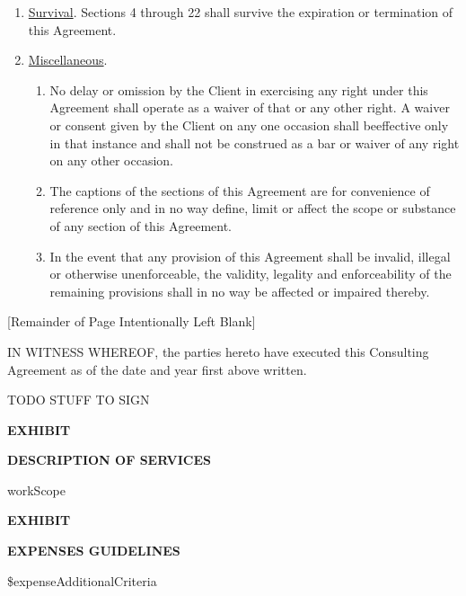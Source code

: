 \documentclass[12pt]{article}
\begin{document}
\begin{enumerate}
    \item \underline{Survival}. Sections 4 through 22 shall survive the expiration or termination of this Agreement.
    \item \underline{Miscellaneous}.
    \begin{enumerate}
        \item No delay or omission by the Client in exercising any right under this Agreement shall operate as a waiver of that or any other right.  A waiver or consent given by the Client on any one occasion shall beeffective only in that instance and shall not be construed as a bar or waiver of any right on any other occasion.
        \item The captions of the sections of this Agreement are for convenience of reference only and in no way define, limit or affect the scope or substance of any section of this Agreement.
        \item In the event that any provision of this Agreement shall be invalid, illegal or otherwise unenforceable, the validity, legality and enforceability of the remaining provisions shall in no way be affected or impaired thereby.
    \end{enumerate}
\end{enumerate}
\begin{center}
[Remainder of Page Intentionally Left Blank]
\end{center}
\newpage

IN WITNESS WHEREOF, the parties hereto have executed this Consulting Agreement as of the date and year first above written.

TODO STUFF TO SIGN
\newpage
\renewcommand{\theexhibit}{\Alph{exhibit}}
\setcounter{exhibit}{0}

\begin{center}
\label{exhibitA}
\vspace{1.5cm}
{\huge\bfseries EXHIBIT  \par}
\vspace{1cm}
{\huge\bfseries \uppercase{Description of Services} \par}
\end{center}
    workScope
\newpage

\begin{center}
\label{exhibitB}
\vspace{1.5cm}
{\huge\bfseries EXHIBIT  \par}
\vspace{1cm}
{\huge\bfseries \uppercase{Expenses Guidelines} \par}
\end{center}
\${expenseAdditionalCriteria}
\newpage
\end{document}
